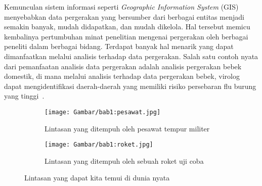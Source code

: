 

Kemunculan sistem informasi seperti \textit{Geographic Information System} (GIS) menyebabkan data pergerakan yang bersumber dari berbagai entitas menjadi semakin banyak, mudah didapatkan, dan mudah dikelola. Hal tersebut memicu kembalinya pertumbuhan minat penelitian mengenai pergerakan oleh berbagai peneliti dalam berbagai bidang. Terdapat banyak hal menarik yang dapat dimanfaatkan melalui analisis terhadap data pergerakan. Salah satu contoh nyata dari pemanfaatan analisis data pergerakan adalah analisis pergerakan bebek domestik, di mana melalui analisis terhadap data pergerakan bebek, virolog dapat mengidentifikasi daerah-daerah yang memiliki risiko persebaran flu burung yang tinggi~\cite{diann:01:movement-analysis}.

\begin{figure}[h]
    \centering
    \begin{subfigure}[h]{0.45\textwidth}
        \centering
        \texttt{[image: Gambar/bab1:pesawat.jpg]}
        \caption{Lintasan yang ditempuh oleh pesawat tempur militer\protect\footnotemark[4]}
        \label{bab1:fighter-plane}
    \end{subfigure} \hspace{0.25cm}
    \begin{subfigure}[h]{0.45\textwidth}
        \centering
        \texttt{[image: Gambar/bab1:roket.jpg]}
        \caption{Lintasan yang ditempuh oleh sebuah roket uji coba\protect\footnotemark[5]}
        \label{bab1:rocket}
    \end{subfigure}
    \caption[Lintasan dalam dunia nyata]{Lintasan yang dapat kita temui di dunia nyata}
    \label{bab1:trajectory}
\end{figure}

